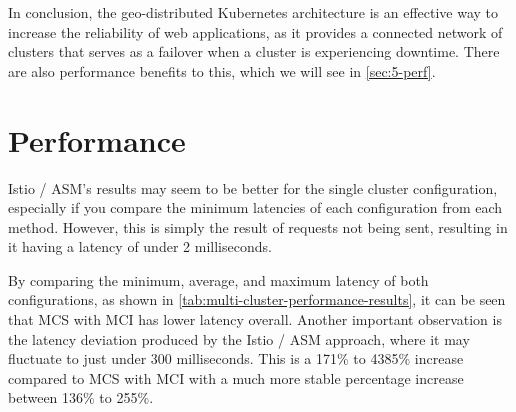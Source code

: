 In conclusion, the geo-distributed Kubernetes architecture is an effective way to increase the reliability of web applications, as it provides a connected network of clusters that serves as a failover when a cluster is experiencing downtime. There are also performance benefits to this, which we will see in \autoref{sec:5-perf}.




\section{Performance}
\label{sec:5-perf}

Istio / ASM's results may seem to be better for the single cluster configuration, especially if you compare the minimum latencies of each configuration from each method. However, this is simply the result of requests not being sent, resulting in it having a latency of under 2 milliseconds.

By comparing the minimum, average, and maximum latency of both configurations, as shown in \autoref{tab:multi-cluster-performance-results}, it can be seen that MCS with MCI has lower latency overall. Another important observation is the latency deviation produced by the Istio / ASM approach, where it may fluctuate to just under 300 milliseconds. This is a 171\% to 4385\% increase compared to MCS with MCI with a much more stable percentage increase between 136\% to 255\%.

